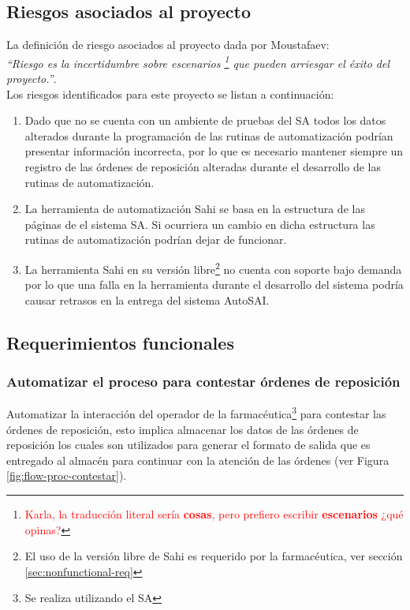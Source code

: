 \subsection{Riesgos asociados al proyecto}\label{sec-riesgos}
La definición de riesgo asociados al proyecto dada por Moustafaev:\\
\textit{``Riesgo es la incertidumbre sobre escenarios \footnote{\textcolor{red}{Karla, la traducción literal sería \textbf{cosas}, pero prefiero escribir \textbf{escenarios} ¿qué opinas?}} que pueden arriesgar el éxito del proyecto.''}\cite{ScopeManagement}.\\
Los riesgos identificados para este proyecto se listan a continuación:
\begin{enumerate}
  \item Dado que no se cuenta con un ambiente de pruebas del SA todos los datos alterados durante la programación de las rutinas de automatización podrían presentar información incorrecta, por lo que es necesario mantener siempre un registro de las órdenes de reposición alteradas durante el desarrollo de las rutinas de automatización.
  \item La herramienta de automatización Sahi se basa en la estructura de las páginas de el sistema SA. Si ocurriera un cambio en dicha estructura las rutinas de automatización podrían dejar de funcionar.
  \item La herramienta Sahi en su versión libre\footnote{El uso de la versión libre de Sahi es requerido por la farmacéutica, ver sección \ref{sec:nonfunctional-req}} no cuenta con soporte bajo demanda por lo que una falla en la herramienta durante el desarrollo del sistema podría causar retrasos en la entrega del sistema AutoSAI.
\end{enumerate}


\subsection{Requerimientos funcionales}
\subsubsection{Automatizar el proceso para contestar órdenes de reposición}
Automatizar la interacción del operador de la farmacéutica\footnote{Se realiza utilizando el SA} para contestar las órdenes de reposición, esto implica almacenar los datos de las órdenes de reposición los cuales son utilizados para generar el formato de salida que es entregado al almacén para continuar con la atención de las órdenes (ver Figura \ref{fig:flow-proc-contestar}).

